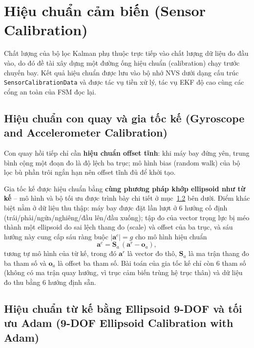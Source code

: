 \section{Hiệu chuẩn cảm biến (Sensor Calibration)}
\label{sec:ekf-calib}

Chất lượng của bộ lọc Kalman phụ thuộc trực tiếp vào chất lượng dữ liệu đo đầu vào, do đó đề tài xây dựng một đường ống hiệu chuẩn (calibration) chạy trước chuyến bay. Kết quả hiệu chuẩn được lưu vào bộ nhớ NVS dưới dạng cấu trúc \texttt{SensorCalibrationData} và được tác vụ tiền xử lý, tác vụ EKF độ cao cùng các cổng an toàn của FSM đọc lại.

\subsection{Hiệu chuẩn con quay và gia tốc kế (Gyroscope and Accelerometer Calibration)}

Con quay hồi tiếp chỉ cần \textbf{hiệu chuẩn offset tĩnh}: khi máy bay đứng yên, trung bình cộng một đoạn đo là độ lệch ba trục; mô hình bias (random walk) của bộ lọc bù phần trôi ngắn hạn nên offset tĩnh đủ để khởi tạo.

Gia tốc kế được hiệu chuẩn bằng \textbf{cùng phương pháp khớp ellipsoid như từ kế} -- mô hình và bộ tối ưu được trình bày chi tiết ở mục~\ref{subsec:ekf-mag-calib} bên dưới. Điểm khác biệt nằm ở dữ liệu thu thập: máy bay được đặt lần lượt ở 6 hướng cố định (trái/phải/ngửa/nghiêng/đầu lên/đầu xuống); tập đo của vector trọng lực bị méo thành một ellipsoid do sai lệch thang đo (scale) và offset của ba trục, và sáu hướng này cung cấp sáu ràng buộc $|\mathbf{a}^{c}| = g$ cho mô hình hiệu chuẩn
\begin{equation}
\mathbf{a}^{c} = \mathbf{S}_a\, (\mathbf{a}^{r} - \mathbf{o}_a),
\end{equation}
tương tự mô hình của từ kế, trong đó $\mathbf{a}^{r}$ là vector đo thô, $\mathbf{S}_a$ là ma trận thang đo ba tham số và $\mathbf{o}_a$ là offset ba tham số. Bài toán của gia tốc kế chỉ còn 6 tham số (không có ma trận quay hướng, vì trục cảm biến trùng hệ trục thân) và dữ liệu đo thu bằng 6 hướng định sẵn.

\subsection{Hiệu chuẩn từ kế bằng Ellipsoid 9-DOF và tối ưu Adam (9-DOF Ellipsoid Calibration with Adam)}
\label{subsec:ekf-mag-calib}

